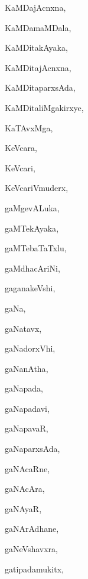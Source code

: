 \begin{multicols}{3}
{\noindent
{KaMDajAcnxna}, \pageref{KaMDajAcnxna}

\noindent
{KaMDamaMDala}, \pageref{KaMDamaMDala}

\noindent
{KaMDitakAyaka}, \pageref{KaMDitakAyaka}

\noindent
{KaMDitajAcnxna}, \pageref{KaMDitajAcnxna}

\noindent
{KaMDitaparxsAda}, \pageref{KaMDitaparxsAda}

\noindent
{KaMDitaliMgakirxye}, \pageref{KaMDitaliMgakirxye}

\noindent
{KaTAvxMga}, \pageref{KaTAvxMga}

\noindent
{KeVcara}, \pageref{KeVcara}

\noindent
{KeVcari}, \pageref{KeVcari}

\noindent
{KeVcariVmuderx}, \pageref{KeVcariVmuderx}

\bigskip
\noindent
{}
\smallskip

\noindent
{gaMgevALuka}, \pageref{gaMgevALuka}

\noindent
{gaMTekAyaka}, \pageref{gaMTekAyaka}

\noindent
{gaMTebaTaTxlu}, \pageref{gaMTebaTaTxlu}

\noindent
{gaMdhacAriNi}, \pageref{gaMdhacAriNi}

\noindent
{gaganakeVshi}, \pageref{gaganakeVshi}

\noindent
{gaNa}, \pageref{gaNa}

\noindent
{gaNatavx}, \pageref{gaNatavx}

\noindent
{gaNadorxVhi}, \pageref{gaNadorxVhi}

\noindent
{gaNanAtha}, \pageref{gaNanAtha}

\noindent
{gaNapada}, \pageref{gaNapada}

\noindent
{gaNapadavi}, \pageref{gaNapadavi}

\noindent
{gaNapavaR}, \pageref{gaNapavaR}

\noindent
{gaNaparxsAda}, \pageref{gaNaparxsAda}

\noindent
{gaNAcaRne}, \pageref{gaNAcaRne}

\noindent
{gaNAcAra}, \pageref{gaNAcAra}

\noindent
{gaNAyaR}, \pageref{gaNAyaR}

\noindent
{gaNArAdhane}, \pageref{gaNArAdhane}

\noindent
{gaNeVshavxra}, \pageref{gaNeVshavxra}

\noindent
{gatipadamukitx}, \pageref{gatipadamukitx}

}
\end{multicols}
